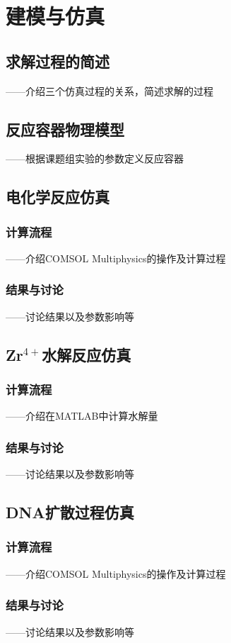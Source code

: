 \chapter{建模与仿真}

\section{求解过程的简述}
——介绍三个仿真过程的关系，简述求解的过程

\section{反应容器物理模型}
——根据课题组实验的参数定义反应容器

\section{电化学反应仿真}
\subsection{计算流程}
——介绍COMSOL Multiphysics的操作及计算过程
\subsection{结果与讨论}
——讨论结果以及参数影响等

\section{Zr$^{4+}$水解反应仿真}
\subsection{计算流程}
——介绍在MATLAB中计算水解量
\subsection{结果与讨论}
——讨论结果以及参数影响等

\section{DNA扩散过程仿真}
\subsection{计算流程}
——介绍COMSOL Multiphysics的操作及计算过程
\subsection{结果与讨论}
——讨论结果以及参数影响等
